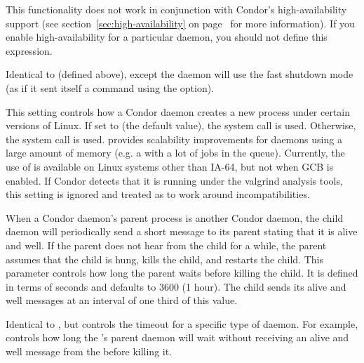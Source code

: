 \begin{description}
  \Note This functionality does not work in conjunction with Condor's
  high-availability support (see section~\ref{sec:high-availability}
  on page~\pageref{sec:high-availability} for more information).
  If you enable high-availability for a particular daemon, you should
  not define this expression.

\label{param:DaemonShutdownFast}
\item[\Macro{DAEMON\_SHUTDOWN\_FAST}]
  Identical to  (defined above), except the
  daemon will use the fast shutdown mode (as if it sent itself a
   command using the  option).

\label{param:UseCloneToCreateProcesses}
\item[\Macro{USE\_CLONE\_TO\_CREATE\_PROCESSES}]
  This setting controls how a Condor daemon creates a new process under
  certain versions of Linux. If set to  (the default value),
  the  system call is used. Otherwise, the  system
  call is used.  provides scalability improvements for daemons
  using a large amount of memory (e.g. a  with a lot of
  jobs in the queue). Currently, the use of  is available on
  Linux systems other than IA-64, but not when GCB is enabled.  If
  Condor detects that it is running under the valgrind analysis tools,
  this setting is ignored and treated as  to work around
  incompatibilities.

\label{param:NotRespondingTimeout}
\item[\Macro{NOT\_RESPONDING\_TIMEOUT}]
  When a Condor daemon's parent process is another Condor daemon, 
  the child daemon will
  periodically send a short message to its parent stating that it is alive
  and well. If the parent does not hear from the child for a while,
  the parent assumes that the child is hung,
  kills the child, and restarts the child. This parameter
  controls how long the parent waits before killing the child. It is defined
  in terms of seconds and defaults to 3600 (1 hour). The child sends its
  alive and well messages at an interval of one third of this value.

\label{param:SubsysNotRespondingTimeout}
\item[\MacroB{<SUBSYS>\_NOT\_RESPONDING\_TIMEOUT}]
  Identical to , but controls the timeout
  for a specific type of daemon. For example,
   controls how long the
  's parent daemon will wait without receiving an 
  alive and well
  message from the  before killing it.


\end{description}
